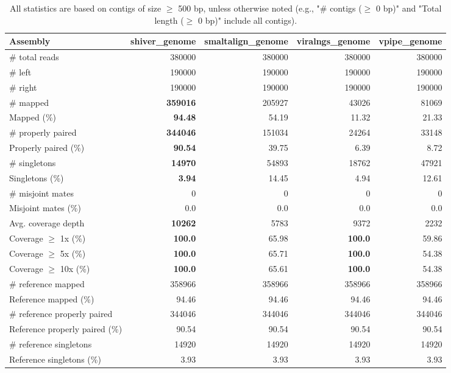 \documentclass[12pt,a4paper]{article}
\begin{document}
\begin{table}[ht]
\begin{center}
\caption{All statistics are based on contigs of size $\geq$ 500 bp, unless otherwise noted (e.g., "\# contigs ($\geq$ 0 bp)" and "Total length ($\geq$ 0 bp)" include all contigs).}
\begin{tabular}{|l*{4}{|r}|}
\hline
Assembly & shiver\_genome & smaltalign\_genome & viralngs\_genome & vpipe\_genome \\ \hline
\# total reads & 380000 & 380000 & 380000 & 380000 \\ \hline
\# left & 190000 & 190000 & 190000 & 190000 \\ \hline
\# right & 190000 & 190000 & 190000 & 190000 \\ \hline
\# mapped & {\bf 359016} & 205927 & 43026 & 81069 \\ \hline
Mapped (\%) & {\bf 94.48} & 54.19 & 11.32 & 21.33 \\ \hline
\# properly paired & {\bf 344046} & 151034 & 24264 & 33148 \\ \hline
Properly paired (\%) & {\bf 90.54} & 39.75 & 6.39 & 8.72 \\ \hline
\# singletons & {\bf 14970} & 54893 & 18762 & 47921 \\ \hline
Singletons (\%) & {\bf 3.94} & 14.45 & 4.94 & 12.61 \\ \hline
\# misjoint mates & 0 & 0 & 0 & 0 \\ \hline
Misjoint mates (\%) & 0.0 & 0.0 & 0.0 & 0.0 \\ \hline
Avg. coverage depth & {\bf 10262} & 5783 & 9372 & 2232 \\ \hline
Coverage $\geq$ 1x (\%) & {\bf 100.0} & 65.98 & {\bf 100.0} & 59.86 \\ \hline
Coverage $\geq$ 5x (\%) & {\bf 100.0} & 65.71 & {\bf 100.0} & 54.38 \\ \hline
Coverage $\geq$ 10x (\%) & {\bf 100.0} & 65.61 & {\bf 100.0} & 54.38 \\ \hline
\# reference mapped & 358966 & 358966 & 358966 & 358966 \\ \hline
Reference mapped (\%) & 94.46 & 94.46 & 94.46 & 94.46 \\ \hline
\# reference properly paired & 344046 & 344046 & 344046 & 344046 \\ \hline
Reference properly paired (\%) & 90.54 & 90.54 & 90.54 & 90.54 \\ \hline
\# reference singletons & 14920 & 14920 & 14920 & 14920 \\ \hline
Reference singletons (\%) & 3.93 & 3.93 & 3.93 & 3.93 \\ \hline

\end{tabular}
\end{center}
\end{table}
\end{document}
